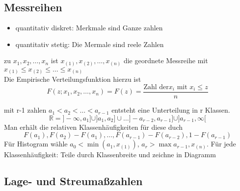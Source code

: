 \documentclass[
	ngerman,
	accentcolor=9c,%
	type=intern,
	marginpar=false
	]{tudapub}
\begin{document}
        \subsection{Messreihen}
            \begin{itemize}
                \item quantitativ diskret: Merkmale sind Ganze zahlen
                \item quantitativ stetig:  Die Mermale sind reele Zahlen
            \end{itemize}
            \begin{definition}
                zu $x_1,x_2,\dots,x_n$ ist $x_{(1)},x_{(2)},\dots,x_{(n)}$ die geordnete Messreihe mit $x_{(1)} \leq x_{(2)}\leq \dots \leq x_{(n)}$\\
                Die Empirische Verteilungsfunktion hierzu ist
                \begin{equation*}
                    F(z;x_1,x_2,\dots,x_n)= F(z)=\dfrac{\text{Zahl der} x_i \text{ mit } x_i \leq z}{n} 
                \end{equation*}
            \end{definition}
            mit r-1 zahlen $a_1 < a_2 < \dots < a_{r-1}$ entsteht eine Unterteilung in r Klassen.
            \begin{equation*}
                \mathbb{R} = ] - \infty, a_1] \cup ] a_1, a_2] \cup \dots ] -a_{r-2}, a_{r-1}] \cup ] a_{r-1}, \infty[
            \end{equation*}
            Man erhält die relativen Klassenhäufigkeiten für diese duch
            \begin{equation*}
                F(a_1),F(a_2)-F(a_1), \dots, F(a_{r-1})-F(a_{r-2}), 1 - F(a_{r-1})
            \end{equation*}
            Für Histogram wähle $a_0 < \min (a_1, x_{(1)})$, $a_r > \max{a_{r-1}, x_{(n)}}$.
            Für jede Klassenhäufigkeit: Teile durch Klassenbreite und zeichne in Diagramm
        \subsection{Lage- und Streumaßzahlen}
\end{document}
